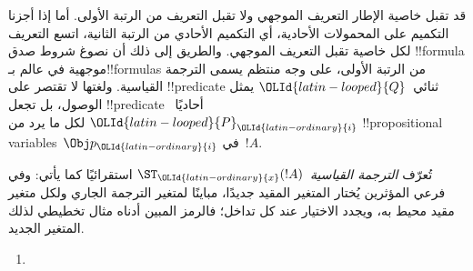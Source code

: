 \documentclass[../../../include/open-logic-section]{subfiles}
\begin{document}


قد تقبل خاصية الإطار التعريف الموجهي ولا تقبل التعريف من الرتبة
الأولى. أما إذا أجزنا التكميم على المحمولات الأحادية، أي التكميم
الأحادي من الرتبة الثانية، اتسع التعريف لكل خاصية تقبل التعريف
الموجهي. والطريق إلى ذلك أن نصوغ شروط صدق !!{formula} موجهية
في عالم بـ!!{formula}s من الرتبة الأولى، على وجه منتظم يسمى الترجمة
القياسية. ولغتها لا تقتصر على !!{predicate} ثنائي~${\OLId{latin-looped}{Q}}$
يمثل الوصول، بل تجعل !!{predicate} أحاديًا~${\OLId{latin-looped}{P}}_{\OLId{latin-ordinary}{i}}$ لكل ما يرد
من !!{propositional variable}s~$\Obj p_{\OLId{latin-ordinary}{i}}$ في~$!A$.

\begin{defn}
  تُعرّف \emph{الترجمة القياسية}~$\ST_{\OLId{latin-ordinary}{x}}(!A)$ استقرائيًا كما يأتي:
  وفي فرعي المؤثرين يُختار المتغير المقيد جديدًا، مباينًا لمتغير
  الترجمة الجاري ولكل متغير مقيد محيط به، ويجدد الاختيار عند كل تداخل؛
  فالرمز المبين أدناه مثال تخطيطي لذلك المتغير الجديد.
  \begin{enumerate}
  \item {}
  \end{enumerate}
\end{defn}
\end{document}

